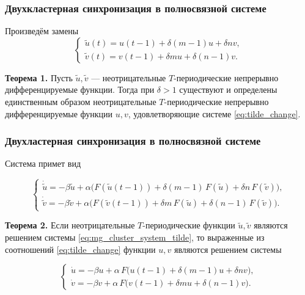 \begin{frame}
	\frametitle{Двухкластерная синхронизация в полносвязной системе}
	Произведём замены 
	\begin{equation}
		\label{eq:tilde_change}
		\begin{cases}
			\tilde{u}(t) = u(t - 1) + \delta (m - 1) u + \delta n v,\\ \tilde{v}(t) = v(t - 1) + \delta m u + \delta (n - 1) v.
		\end{cases}
	\end{equation}
	
	\bigskip
	
	\textbf{Теорема 1.} Пусть $\tilde{u}, \tilde{v}$ --- неотрицательные $T$-периодические непрерывно дифференцируемые функции. Тогда при $\delta > 1$ существуют и определены единственным образом неотрицательные $T$-периодические непрерывно дифференцируемые функции $u, v$, удовлетворяющие системе \eqref{eq:tilde_change}.
\end{frame}


\begin{frame}
	\frametitle{Двухластерная синхронизация в полносвязной системе}
	
	Система примет вид
	
	\begin{equation}
		\label{eq:mg_cluster_system_tilde}
		\begin{cases}
			\dot{\tilde{u}} = -\beta \tilde{u} + \alpha \big(F(\tilde{u}(t - 1)) + \delta (m - 1) \, F(\tilde{u}) + \delta n \, F(\tilde{v})\big),\\
			\dot{\tilde{v}} = -\beta \tilde{v} + \alpha \big(F(\tilde{v}(t - 1)) + \delta m \, F(\tilde{u}) + \delta (n - 1) \, F(\tilde{v})\big).
		\end{cases}
	\end{equation}
	
	\bigskip
	
	\textbf{Теорема 2.} Если неотрицательные $T$-периодические функции $\tilde{u}, \tilde{v}$ являются решением системы \eqref{eq:mg_cluster_system_tilde}, то выраженные из соотношений \eqref{eq:tilde_change} функции $u, v$ являются решением системы
	
	\begin{equation*}
		\begin{cases}
			\dot{u} = -\beta u + \alpha \, F \bigg(u(t - 1) + \delta (m - 1) u + \delta n v\bigg),\\
			\dot{v} = -\beta v + \alpha  \, F \bigg(v(t - 1) + \delta m u + \delta (n - 1) v\bigg).
		\end{cases}
	\end{equation*}
\end{frame}

